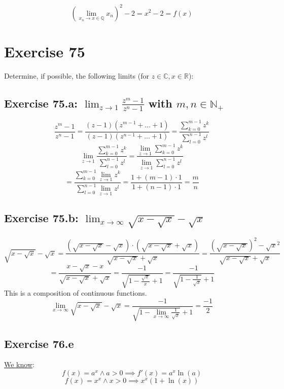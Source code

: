 \documentclass[a4paper]{article}
\theoremstyle{definition}
\begin{document}
\[ \left(\lim_{x_n \to x \in \mathbb Q} x_n\right)^2 - 2 = x^2 - 2 = f(x) \]

\section{Exercise 75}
\begin{ex}
  Determine, if possible, the following limits (for $z \in \mathbb C, x \in \mathbb R$):
\end{ex}

\subsection{Exercise 75.a: $\lim_{z\to1} \frac{z^m - 1}{z^n - 1}$ with $m,n \in \mathbb N_+$}
%
\[
  \frac{z^m - 1}{z^n - 1} = \frac{(z - 1)(z^{m-1} + \ldots + 1)}{(z - 1)(z^{n-1} + \ldots + 1)}
    = \frac{\sum_{k=0}^{m-1} z^k}{\sum_{l=0}^{n-1} z^l}
\] \[
  \lim_{z\to 1} \frac{\sum_{k=0}^{m-1} z^k}{\sum_{l=0}^{n-1} z^l}
    = \frac{\lim_{z\to1} \sum_{k=0}^{m-1} z^k}{\lim_{z\to1} \sum_{l=0}^{n-1} z^l}
\] \[
  = \frac{\sum_{k=0}^{m-1} \lim_{z\to1} z^k}{\sum_{l=0}^{n-1} \lim_{z\to1} z^l}
  = \frac{1 + (m - 1) \cdot 1}{1 + (n - 1) \cdot 1} = \frac mn
\]

\subsection{Exercise 75.b: $\lim_{x\to\infty} \sqrt{x - \sqrt{x}} - \sqrt{x}$}
%
\[
  \sqrt{x - \sqrt{x}} - \sqrt{x}
    = \frac{\left(\sqrt{x - \sqrt{x}} - \sqrt{x}\right) \cdot \left(\sqrt{x - \sqrt{x}} + \sqrt{x}\right)}{\sqrt{x - \sqrt{x}} + \sqrt{x}}
    = \frac{\left(\sqrt{x - \sqrt{x}}\right)^2 - \sqrt{x}^2}{\sqrt{x - \sqrt{x}} + \sqrt{x}}
\] \[
  = \frac{x - \sqrt{x} - x}{\sqrt{x - \sqrt{x}} + \sqrt{x}}
    = \frac{-1}{\sqrt{1 - \frac{\sqrt{x}}{x}} + 1}
    = \frac{-1}{\sqrt{1 - \frac{1}{\sqrt{x}}} + 1}
\]
This is a composition of continuous functions.
\[
  \lim_{x\to\infty} \sqrt{x - \sqrt{x}} - \sqrt{x}
    = \frac{-1}{\sqrt{1 - \lim_{x\to\infty} \frac{1}{\sqrt{x}}} + 1} = \frac{-1}{2}
\]

\subsection{Exercise 76.e}

\href{https://math.stackexchange.com/a/1755387/38726}{We know}:
\[ f(x) = a^x \land a > 0 \implies f'(x) = a^x \ln(a) \]
\[ f(x) = x^x \land x > 0 \implies x^x (1 + \ln(x)) \]
\end{document}

